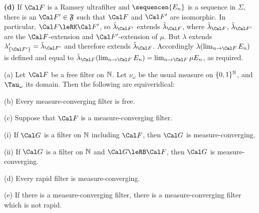{\medskip

{\bf (d)} If $\Cal F$ is a Ramsey ultrafilter and $\sequencen{E_n}$ is a
sequence in $\Sigma$, there is an $\Cal F'\in\frak F$ such that
$\Cal F$ and $\Cal F'$ are isomorphic.   In particular,
$\Cal F\leRK\Cal F'$, so $\tilde\lambda_{\Cal F'}$ extends
$\tilde\lambda_{\Cal F}$, where
$\tilde\lambda_{\Cal F}$, $\tilde\lambda_{\Cal F'}$ are the
$\Cal F$-extension and $\Cal F'$-extension of
$\mu$.   But $\lambda$ extends
$\lambda'_{\{\Cal F'\}}=\tilde\lambda_{\Cal F'}$ and therefore extends
$\tilde\lambda_{\Cal F}$.   Accordingly $\lambda(\lim_{n\to\Cal F}E_n)$ is
defined and equal to
$\tilde\lambda_{\Cal F}(\lim_{n\to\Cal F}E_n)=\lim_{n\to\Cal F}\mu E_n$, as
required.
}%

 (a) Let $\Cal F$
be a free filter on $\Bbb N$.
Let $\nu_{\omega}$ be the usual measure on $\{0,1\}^{\Bbb N}$, and
$\Tau_{\omega}$ its domain.   Then the following are equiveridical:


(b) Every measure-converging filter is free.

(c) Suppose that $\Cal F$ is a measure-converging filter.

\quad(i) If $\Cal G$ is a filter on $\Bbb N$ including $\Cal F$, then
$\Cal G$ is measure-converging.

\quad(ii) If $\Cal G$ is a filter on $\Bbb N$ and
$\Cal G\leRB\Cal F$, then $\Cal G$ is
measure-converging.

(d) Every rapid filter is measure-converging.

(e) If there is a measure-converging filter,
there is a measure-converging filter which is not rapid.

